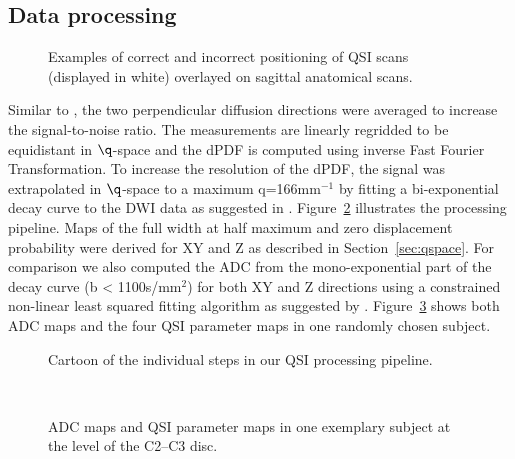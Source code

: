 \subsection{Data processing}
\begin{figure}[tb]
\centering
	\hspace{0.015\textwidth}
\caption{Examples of correct and incorrect positioning of QSI scans (displayed in white) overlayed on sagittal anatomical scans.}
\label{fig:chapter5 positioning}
\end{figure}
Similar to \citet{Farrell:2008}, the two perpendicular diffusion directions were averaged to increase the signal-to-noise ratio. The measurements are linearly regridded to be equidistant in $\q$-space and the  {\gls{dPDF}} is computed using inverse Fast Fourier Transformation. To increase the resolution of the  {\gls{dPDF}}, the signal was extrapolated in $\q$-space to a maximum q=166mm$^{-1}$ by fitting a bi-exponential decay curve to the {\gls{DWI}} data as suggested in \citet{Cohen:2002, Farrell:2008}. Figure~\ref{fig:chapter5 exp1 processing pipeline} illustrates the processing pipeline. Maps of the full width at half maximum and zero displacement probability were derived for XY and Z as described in Section~\ref{sec:qspace}. For comparison we also computed the \gls{ADC} from the mono-exponential part of the decay curve (b < 1100s/mm$^2$) for both XY and Z directions using a constrained non-linear least squared fitting algorithm as suggested by \citet{Farrell:2008}. Figure~\ref{fig:chapter5 exemplary maps} shows both \gls{ADC} maps and the four \gls{QSI} parameter maps in one randomly chosen subject.
\begin{figure}[p]
  \caption{Cartoon of the individual steps in our QSI processing pipeline.}
  \label{fig:chapter5 exp1 processing pipeline}
\end{figure}
\begin{figure}[p]
\centering
{}
\\
\caption{ADC maps and QSI parameter maps in one exemplary subject at the level of the C2--C3 disc.}
\label{fig:chapter5 exemplary maps}
\end{figure}

